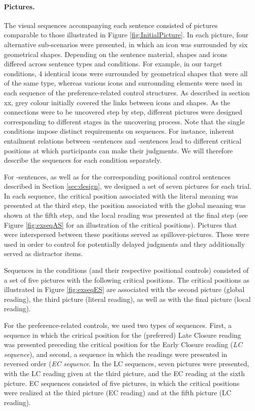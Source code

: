 \documentclass[fleqn,reqno,10pt,draft]{article}
\newcommand{\as}{\acro{as}}
\renewcommand{\es}{\acro{es}}
\begin{document}
\paragraph{Pictures.}
The visual sequences accompanying each sentence consisted of pictures
comparable to those illustrated in Figure \ref{fig:InitialPicture}. In
each picture, four alternative sub-scenarios were presented, in which
an icon was surrounded by six geometrical shapes. Depending on the
sentence material, shapes and icons differed across sentence types and
conditions. For example, in our target conditions, 4 identical icons
were surrounded by geometrical shapes that were all of the same type,
whereas various icons and surrounding elements were used in each
sequence of the preference-related control structures. As described in
section xx, grey colour initially covered the links between icons and
shapes. As the connections were to be uncovered step by step,
different pictures were designed corresponding to different stages in
the uncovering process. Note that the single conditions impose
distinct requirements on sequences. For instance, inherent entailment
relations between \as-sentences and \es-sentences lead to different
critical positions at which participants can make their judgments. We
will therefore describe the sequences for each condition separately.

For \as-sentences, as well as for the corresponding positional control
sentences described in Section \ref{sec:design}, we designed a set of
seven pictures for each trial. In each sequence, the critical position
associated with the literal meaning was presented at the third step,
the position associated with the global meaning was shown at the fifth
step, and the local reading was presented at the final step (see
Figure \ref{fig:exseqAS} for an illustration of the critical
positions). Pictures that were interspersed between these positions
served as spillover-pictures. These were used in order to control for
potentially delayed judgments and they additionally served as
distractor items.

Sequences in the \es conditions (and their respective positional
controls) consisted of a set of five pictures with the following
critical positions. The critical positions as illustrated in Figure
\ref{fig:exseqES} are associated with the second picture (global
reading), the third picture (literal reading), as well as with the
final picture (local reading).

For the preference-related controls, we used two types of
sequences. First, a sequence in which the crirical position for the
(preferred) Late Closure reading was presented preceding the critical
position for the Early Closure reading ({\it LC sequence}), and
second, a sequence in which the readings were presented in reversed
order ({\it EC sequence}. In the LC sequences, seven pictures were
presented, with the LC reading given at the third picture, and the EC
reading at the sixth picture. EC sequences consisted of five pictures,
in which the critical positions were realized at the third picture (EC
reading) and at the fifth picture (LC reading).
\end{document}
